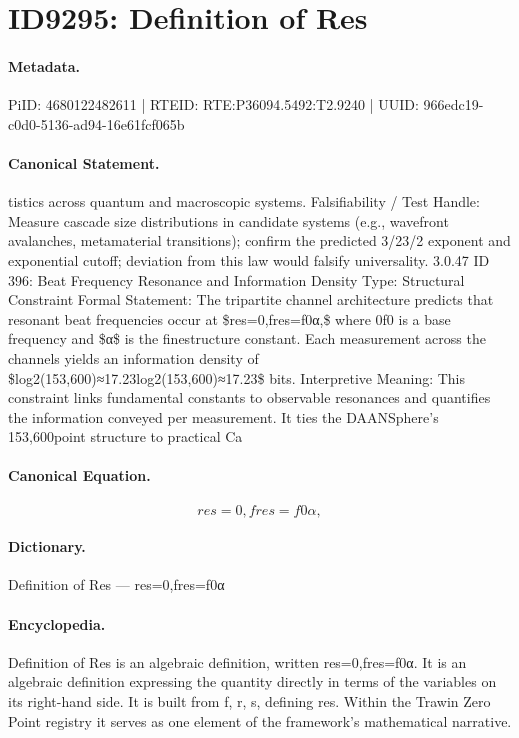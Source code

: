 \section*{ID9295: Definition of Res}
\paragraph{Metadata.}
PiID: 4680122482611 | RTEID: RTE:P36094.5492:T2.9240 | UUID: 966edc19-c0d0-5136-ad94-16e61fcf065b

\paragraph{Canonical Statement.}
tistics across quantum and macroscopic systems. Falsifiability / Test Handle: Measure cascade size distributions in candidate systems (e.g., wavefront avalanches, metamaterial transitions); confirm the predicted 3/23/2 exponent and exponential cutoff; deviation from this law would falsify universality. 3.0.47 ID 396: Beat Frequency Resonance and Information Density Type: Structural Constraint Formal Statement: The tripartite channel architecture predicts that resonant beat frequencies occur at \$res=0,fres=f0α,\$ where 0f0 is a base frequency and \$α\$ is the finestructure constant. Each measurement across the channels yields an information density of \$log2(153,600)≈17.23log2(153,600)≈17.23\$ bits. Interpretive Meaning: This constraint links fundamental constants to observable resonances and quantifies the information conveyed per measurement. It ties the DAANSphere’s 153,600point structure to practical Ca

\paragraph{Canonical Equation.}
\[
res=0,fres=f0α,
\]

\paragraph{Dictionary.}
Definition of Res — res=0,fres=f0α

\paragraph{Encyclopedia.}
Definition of Res is an algebraic definition, written res=0,fres=f0α. It is an algebraic definition expressing the quantity directly in terms of the variables on its right-hand side. It is built from f, r, s, defining res. Within the Trawin Zero Point registry it serves as one element of the framework's mathematical narrative.
